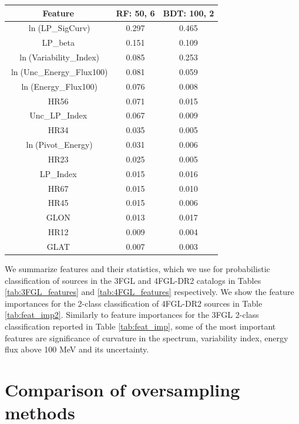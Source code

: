 \documentclass{aa}
\newcommand{\lb}{\label}
\begin{document}
\begin{appendix}
\begin{table}[!h]
\tiny
\centering
\renewcommand{\tabcolsep}{1mm}
\renewcommand{\arraystretch}{1}

\begin{tabular}{c c c}
\hline
\hline
Feature & RF: 50, 6& BDT: 100, 2\\
\hline
{ $\ln$(LP\_SigCurv)}&  0.297  & 0.465   \\
{LP\_beta}&0.151&0.109\\
{ $\ln$(Variability\_Index)} &0.085& 0.253   \\
$\ln$(Unc\_Energy\_Flux100)& 0.081&0.059  \\
$\ln$(Energy\_Flux100) & 0.076&0.008   \\
HR56&0.071& 0.015  \\
Unc\_LP\_Index & 0.067&0.009  \\
HR34& 0.035&0.005  \\
$\ln$(Pivot\_Energy)&0.031&0.006\\
HR23 &0.025& 0.005     \\
 LP\_Index& 0.015&0.016  \\
HR67&0.015&0.010\\
HR45&0.015&0.006\\
GLON&0.013&0.017\\
HR12&0.009&0.004\\
GLAT&0.007&0.003\\
\hline
\end{tabular}
\end{table}



We summarize features and their statistics,
which we use for probabilistic classification of sources in the 3FGL and 4FGL-DR2 catalogs
in Tables \ref{tab:3FGL_features} and \ref{tab:4FGL_features} respectively. 
We show the feature importances for the 2-class classification of 4FGL-DR2 sources in Table \ref{tab:feat_imp2}.
Similarly to feature importances for the 3FGL 2-class classification reported in Table \ref{tab:feat_imp}, 
some of the most important features are significance of curvature in the spectrum, variability index, energy flux above 100 MeV and its uncertainty.

\section{Comparison of oversampling methods}
\lb{sec:app_O_vs_S}


\end{appendix}
\end{document}
